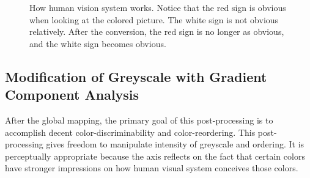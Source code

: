 \documentclass{article}
\begin{document}
\begin{figure}[h]
  \begin{center}
  \end{center}
  \caption{How human vision system works. Notice that the red sign is obvious when looking at the colored picture. The white sign is not obvious relatively. After the conversion, the red sign is no longer as obvious, and the white sign becomes obvious.}
  \label{fig:humanvisionsystem}
\end{figure}


\subsection{Modification of Greyscale with Gradient Component Analysis}
 After the global mapping, the primary goal of this post-processing is to accomplish decent color-discriminability and color-reordering. This post-processing gives freedom to manipulate intensity of greyscale and ordering. It is perceptually appropriate because the axis reflects on the fact that certain colors have stronger impressions on how human visual system conceives those colors.
\end{document}
